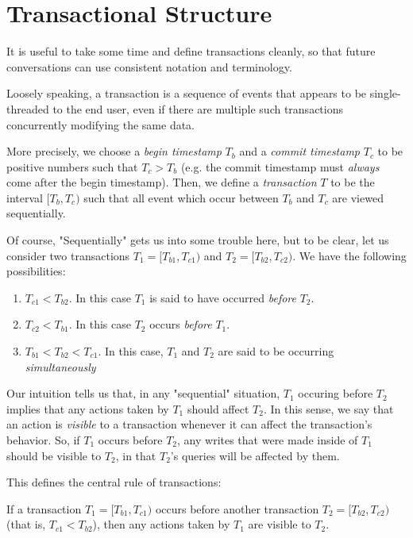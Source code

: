 \section{Transactional Structure}
It is useful to take some time and define transactions cleanly, so that future conversations can use consistent notation and terminology.

Loosely speaking, a transaction is a sequence of events that appears to be single-threaded to the end user, even if there are multiple such transactions concurrently modifying the same data.

More precisely, we choose a \emph{begin timestamp} $T_b$ and a \emph{commit timestamp} $T_c$ to be positive numbers such that $T_c >T_b$ (e.g. the commit timestamp must \emph{always} come after the begin timestamp). Then, we define a \emph{transaction} $T$ to be the interval $[T_b,T_c)$ such that all event which occur between $T_b$ and $T_c$ are viewed sequentially.

Of course, "Sequentially" gets us into some trouble here, but to be clear, let us consider two transactions $T_1 = [T_{b1},T_{c1})$ and $T_2 = [T_{b2},T_{c2})$. We have the following possibilities:

\begin{enumerate}
				\item $T_{c1} < T_{b2}$. In this case $T_1$ is said to have occurred \emph{before} $T_2$.
				\item $T_{c2} < T_{b1}$. In this case $T_2$ occurs \emph{before} $T_1$.
				\item $T_{b1} < T_{b2} < T_{c1}$. In this case, $T_1$ and $T_2$ are said to be occurring \emph{simultaneously}
\end{enumerate}

Our intuition tells us that, in any "sequential" situation, $T_1$ occuring before $T_2$ implies that any actions taken by $T_1$ should affect $T_2$. In this sense, we say that an action is \emph{visible} to a transaction whenever it can affect the transaction's behavior. So, if $T_1$ occurs before $T_2$, any writes that were made inside of $T_1$ should be visible to $T_2$, in that $T_2$'s queries will be affected by them.

This defines the central rule of transactions: 

\begin{theorem}
				If a transaction $T_1 = [T_{b1},T_{c1})$ occurs before another transaction $T_2 = [T_{b2},T_{c2})$(that is, $T_{c1} < T_{b2}$), then any actions taken by $T_1$ are visible to $T_2$.
\end{theorem}


